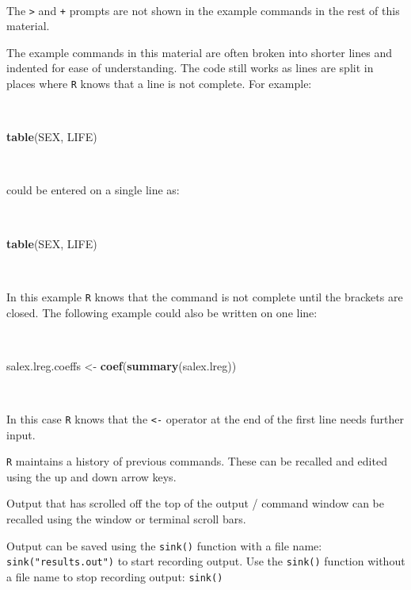 \documentclass[12pt,a4paper]{book}
\newenvironment{Shaded}{\begin{snugshade}}{\end{snugshade}}
\newcommand{\KeywordTok}[1]{\textcolor[rgb]{0.13,0.29,0.53}{\textbf{#1}}}
\newcommand{\NormalTok}[1]{#1}
\newcommand{\StringTok}[1]{\textcolor[rgb]{0.31,0.60,0.02}{#1}}
\theoremstyle{definition}
\theoremstyle{definition}
\theoremstyle{definition}
\theoremstyle{remark}
\begin{document}
~

The \texttt{\textgreater{}} and \texttt{+} prompts are not shown in the
example commands in the rest of this material.

The example commands in this material are often broken into shorter
lines and indented for ease of understanding. The code still works as
lines are split in places where \texttt{R} knows that a line is not
complete. For example:

~

\begin{Shaded}
\begin{Highlighting}[]
\KeywordTok{table}\NormalTok{(SEX,}
\NormalTok{      LIFE)}
\end{Highlighting}
\end{Shaded}

~

could be entered on a single line as:

~

\begin{Shaded}
\begin{Highlighting}[]
\KeywordTok{table}\NormalTok{(SEX, LIFE)}
\end{Highlighting}
\end{Shaded}

~

In this example \texttt{R} knows that the command is not complete until
the brackets are closed. The following example could also be written on
one line:

~

\begin{Shaded}
\begin{Highlighting}[]
\NormalTok{salex.lreg.coeffs <-}
\StringTok{  }\KeywordTok{coef}\NormalTok{(}\KeywordTok{summary}\NormalTok{(salex.lreg))}
\end{Highlighting}
\end{Shaded}

~

In this case \texttt{R} knows that the \texttt{\textless{}-} operator at
the end of the first line needs further input.

\texttt{R} maintains a history of previous commands. These can be
recalled and edited using the up and down arrow keys.

Output that has scrolled off the top of the output / command window can
be recalled using the window or terminal scroll bars.

Output can be saved using the \texttt{sink()} function with a file name:
\texttt{sink("results.out")} to start recording output. Use the
\texttt{sink()} function without a file name to stop recording output:
\texttt{sink()}
\end{document}
